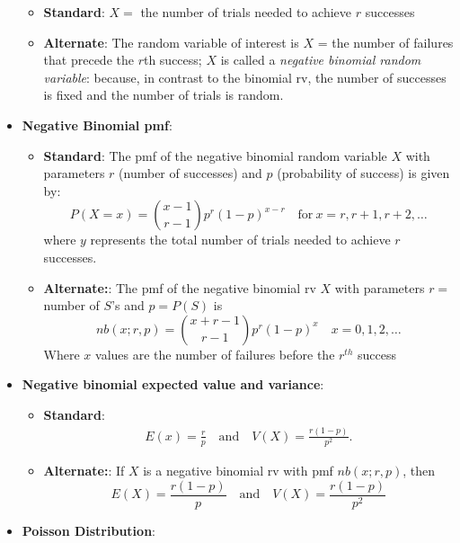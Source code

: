 \documentclass{report}
\begin{document}
\begin{itemize}
        \begin{itemize}
            \item \textbf{Standard}: $X=$ the number of trials needed to achieve $r$ successes
            \item \textbf{Alternate}: The random variable of interest is \( X \) = the number of failures that precede the \( r \)th success; \( X \) is called a \textit{negative binomial random variable}: because, in contrast to the binomial rv, the number of successes is fixed and the number of trials is random.
        \end{itemize}
    \item \textbf{Negative Binomial pmf}: 
        \begin{itemize}
            \item \textbf{Standard}:
                The pmf of the negative binomial random variable \(X\) with parameters \(r\) (number of successes) and \(p\) (probability of success) is given by:
                \[
                    P(X = x) = \binom{x-1}{r-1} p^r (1-p)^{x-r} \quad \text{for} \ x = r, r+1, r+2, \ldots
                \]
                where \(y\) represents the total number of trials needed to achieve \(r\) successes.
            \item \textbf{Alternate:}: 
                The pmf of the negative binomial rv \( X \) with parameters \( r = \) number of \( S \)'s and \( p = P(S) \) is
                \[
                    nb(x; r, p) = \binom{x + r - 1}{r - 1} p^r (1 - p)^x \quad x = 0, 1, 2, \ldots
                \]
                Where $x$ values are the number of failures before the $r^{th}$ success
        \end{itemize}
    \item \textbf{Negative binomial expected value and variance}:
        \begin{itemize}
            \item \textbf{Standard}:
                \begin{align*}
                    E(x) = \frac{r}{p} \quad \text{and} \quad V(X) = \frac{r(1-p)}{p^{2}}
                .\end{align*}
            \item \textbf{Alternate:}:
            If \( X \) is a negative binomial rv with pmf \( nb(x; r, p) \), then
            \[
                E(X) = \frac{r(1 - p)}{p} \quad \text{and} \quad V(X) = \frac{r(1 - p)}{p^2}
            \]
    \end{itemize}
    \item \textbf{Poisson Distribution}:

\end{itemize}
\end{document}
